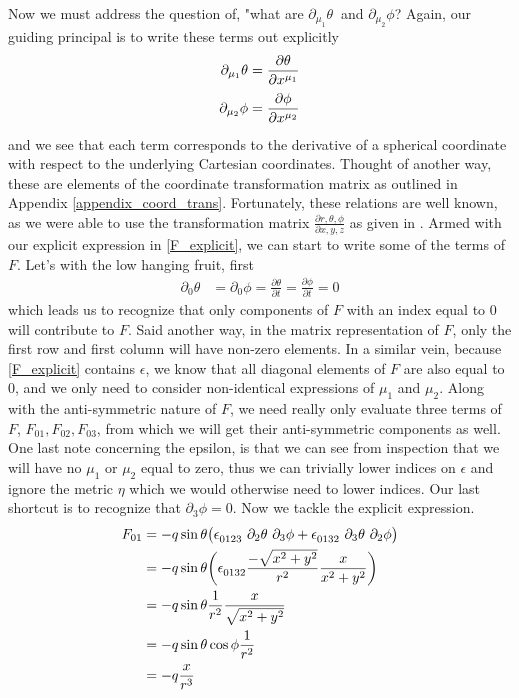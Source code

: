 Now we must address the question of, "what are $ \partial_{\mu_1} \theta \ $ and $\partial_{\mu_2} \phi$? Again, our guiding principal is to write these terms out explicitly 
%
\begin{align}
\label{F_explicit}
\partial_{\mu_1} \theta &= \frac{\partial  \theta}{\partial  x\indices{^{\mu_1}}}  \notag \\ 
\partial_{\mu_2} \phi &= \frac{\partial  \phi}{\partial  x\indices{^{\mu_2}}} 
\end{align} 
%
and we see that each term corresponds to the derivative of a spherical coordinate with respect to the underlying Cartesian coordinates. Thought of another way, these are elements of the coordinate transformation matrix as outlined in Appendix \ref{appendix_coord_trans}. Fortunately, these relations are well known, as we were able to use the transformation matrix $\frac{\partial{r, \theta, \phi}}{\partial{x, y, z}}$ as given in \cite{Wiki:1}. Armed with our explicit expression in \ref{F_explicit}, we can start to write some of the terms of $F$. Let's with the low hanging fruit, first
%
\begin{align}
	\partial_{0} \theta &=\partial_{0} \phi = \frac{\partial  \theta}{\partial  t} = \frac{\partial  \phi}{\partial  t} = 0
\end{align} 
%
which leads us to recognize that only components of $F$ with an index equal to $0$ will contribute to $F$. Said another way, in the matrix representation of $F$, only the first row and first column will have non-zero elements. In a similar vein, because \ref{F_explicit} contains $\epsilon$, we know that all diagonal elements of $F$ are also equal to $0$, and we only need to consider non-identical expressions of $\mu_1$ and $\mu_2$. Along with the anti-symmetric nature of $F$, we need really only evaluate three terms of $F$, $F_{01}, F_{02}, F_{03}$, from which we will get their anti-symmetric components as well. One last note concerning the epsilon, is that we can see from inspection that we will have no $\mu_1$ or $\mu_2$ equal to zero, thus we can trivially lower indices on $\epsilon$ and ignore the metric $\eta$ which we would otherwise need to lower indices. Our last shortcut is to recognize that $\partial_3 \phi = 0$. Now we tackle the explicit expression.
%
\begin{align}
	F_{0 1} &= - q \sin{\theta} \big( \epsilon\indices{_{0123}} \ \partial_{2} \theta \ \partial_{3} \phi +  \epsilon\indices{_{0132}} \ \partial_{3} \theta \ \partial_{2} \phi \big) \notag \\
	&= - q \sin{\theta} \bigg( \epsilon\indices{_{0132}} \frac{-\sqrt{x^2 + y^2}}{r^2} \frac{x}{x^2 + y^2} \bigg)  \notag \\
	&= - q \sin{\theta} \frac{1}{r^2} \frac{x}{\sqrt{x^2 + y^2}}  \notag \\
	&= - q \sin{\theta} \cos{\phi} \frac{1}{r^2}  \notag \\
	&= - q \frac{x}{r^3}
\end{align} 
